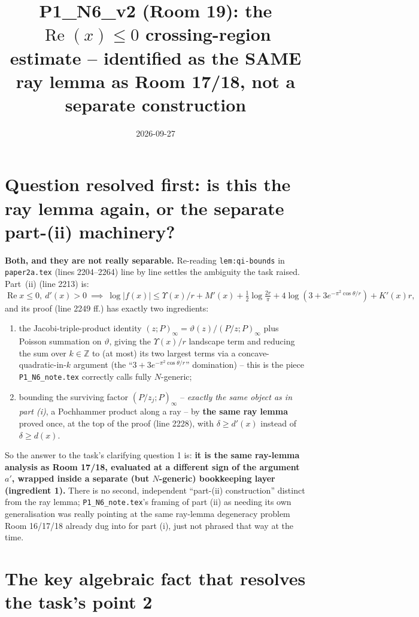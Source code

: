 \documentclass[11pt]{article}
\title{P1\_N6\_v2 (Room 19): the $\operatorname{Re}(x)\le0$ crossing-region estimate --
identified as the SAME ray lemma as Room 17/18, not a separate construction}
\date{2026-09-27}
\begin{document}
\maketitle

\section*{Question resolved first: is this the ray lemma again, or the separate part-(ii)
machinery?}

\textbf{Both, and they are not really separable.} Re-reading \texttt{lem:qi-bounds} in
\texttt{paper2a.tex} (lines 2204--2264) line by line settles the ambiguity the task raised.
Part~(ii) (line 2213) is:
\[
  \operatorname{Re}x\le0,\ d'(x)>0\ \implies\
  \log|f(x)|\le \Upsilon(x)/r + M'(x) + \tfrac12\log\tfrac{2r}\pi
   + 4\log(3+3e^{-\pi^2\cos\theta/r}) + K'(x)r,
\]
and its proof (line 2249 ff.) has exactly two ingredients:
\begin{enumerate}
\item the Jacobi-triple-product identity $(z;P)_\infty=\vartheta(z)/(P/z;P)_\infty$ plus Poisson
summation on $\vartheta$, giving the $\Upsilon(x)/r$ landscape term and reducing the sum over
$k\in\mathbb Z$ to (at most) its two largest terms via a concave-quadratic-in-$k$ argument
(the ``$3+3e^{-\pi^2\cos\theta/r}$'' domination) -- this is the piece \texttt{P1\_N6\_note.tex}
correctly calls fully $N$-generic;
\item bounding the surviving factor $(P/z_j;P)_\infty$ -- \emph{exactly the same object as in
part (i)}, a Pochhammer product along a ray -- by \textbf{the same ray lemma} proved once, at the
top of the proof (line 2228), with $\delta\ge d'(x)$ instead of $\delta\ge d(x)$.
\end{enumerate}
So the answer to the task's clarifying question 1 is: \textbf{it is the same ray-lemma analysis
as Room 17/18, evaluated at a different sign of the argument $a'$, wrapped inside a separate
(but $N$-generic) bookkeeping layer (ingredient 1).} There is no second, independent
``part-(ii) construction'' distinct from the ray lemma; \texttt{P1\_N6\_note.tex}'s framing of
part (ii) as needing its own generalisation was really pointing at the same ray-lemma
degeneracy problem Room 16/17/18 already dug into for part (i), just not phrased that way at the
time.

\section*{The key algebraic fact that resolves the task's point 2}
\end{document}
